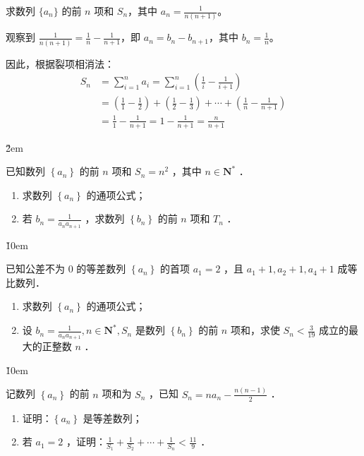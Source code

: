 \begin{example}
    求数列 $\{a_n\}$ 的前 $n$ 项和 $S_n$，其中 $a_n = \frac{1}{n(n+1)}$。
\end{example}

\begin{solution}
    观察到 $\frac{1}{n(n+1)} = \frac{1}{n} - \frac{1}{n+1}$，即 $a_n = b_n - b_{n+1}$，其中 $b_n = \frac{1}{n}$。

    因此，根据裂项相消法：
    \begin{align}
        S_n & = \sum_{i=1}^{n} a_i = \sum_{i=1}^{n} \left(\frac{1}{i} - \frac{1}{i+1}\right)                                                        \\
            & = \left(\frac{1}{1} - \frac{1}{2}\right) + \left(\frac{1}{2} - \frac{1}{3}\right) + \cdots + \left(\frac{1}{n} - \frac{1}{n+1}\right) \\
            & = \frac{1}{1} - \frac{1}{n+1} = 1 - \frac{1}{n+1} = \frac{n}{n+1}
    \end{align}
\end{solution}

\v{2em}

\begin{example}
    已知数列 $\left\{a_n\right\}$ 的前 $n$ 项和 $S_n=n^2$ ，其中 $n \in \mathbf{N}^*$ ．
    \begin{enumerate}
        \item 求数列 $\left\{a_n\right\}$ 的通项公式；

        \item 若 $b_n=\frac{1}{a_n a_{n+1}}$ ，求数列 $\left\{b_n\right\}$ 的前 $n$ 项和 $T_n$ ．
    \end{enumerate}
\end{example}

\v{10em}

\begin{example}
    已知公差不为 0 的等差数列 $\left\{a_n\right\}$ 的首项 $a_1=2$ ，且 $a_1+1, a_2+1, a_4+1$ 成等比数列．
    \begin{enumerate}
        \item 求数列 $\left\{a_n\right\}$ 的通项公式；
        \item 设 $b_n=\frac{1}{a_n a_{n+1}}, n \in \mathbf{N}^*, S_n$ 是数列 $\left\{b_n\right\}$ 的前 $n$ 项和，求使 $S_n<\frac{3}{19}$ 成立的最大的正整数 $n$ ．
    \end{enumerate}
\end{example}

\v{10em}

\begin{example}
    记数列 $\left\{a_n\right\}$ 的前 $n$ 项和为 $S_n$ ，已知 $S_n=n a_n-\frac{n(n-1)}{2}$ ．
    \begin{enumerate}
        \item 证明：$\left\{a_n\right\}$ 是等差数列；
        \item 若 $a_1=2$ ，证明：$\frac{1}{S_1}+\frac{1}{S_2}+\cdots+\frac{1}{S_n}<\frac{11}{9}$ ．
    \end{enumerate}
\end{example}

